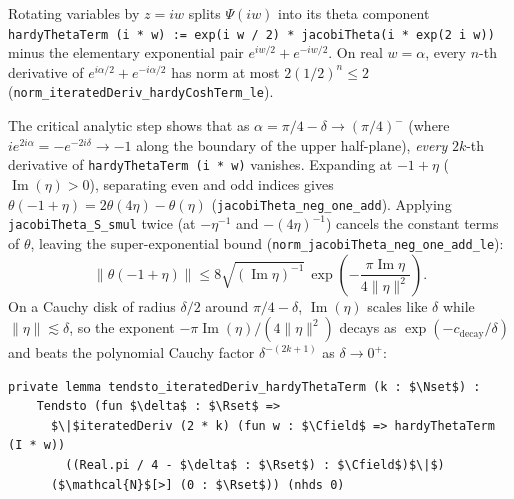 \documentclass[11pt,a4paper]{article}
\theoremstyle{definition}
\newcommand{\Nset}{\mathbb{N}}
\newcommand{\Rset}{\mathbb{R}}
\newcommand{\Cfield}{\mathbb{C}}
\begin{document}
Rotating variables by $z = i w$ splits $\Psi(i w)$ into its theta component \texttt{hardyThetaTerm (i * w) := exp(i w / 2) * jacobiTheta(i * exp(2 i w))} minus the elementary exponential pair $e^{iw/2} + e^{-iw/2}$. On real $w = \alpha$, every $n$-th derivative of $e^{i\alpha/2} + e^{-i\alpha/2}$ has norm at most $2(1/2)^n \le 2$ (\texttt{norm\_\allowbreak iteratedDeriv\_\allowbreak hardyCoshTerm\_le}).

The critical analytic step shows that as $\alpha = \pi/4 - \delta \to (\pi/4)^-$ (where $i e^{2i\alpha} = -e^{-2i\delta} \to -1$ along the boundary of the upper half-plane), \emph{every} $2k$-th derivative of \texttt{hardyThetaTerm (i * w)} vanishes. Expanding at $-1 + \eta$ ($\operatorname{Im}(\eta) > 0$), separating even and odd indices gives $\theta(-1 + \eta) = 2\theta(4\eta) - \theta(\eta)$ (\texttt{jacobiTheta\_\allowbreak neg\_\allowbreak one\_add}). Applying \texttt{jacobiTheta\_S\_smul} twice (at $-\eta^{-1}$ and $-(4\eta)^{-1}$) cancels the constant terms of $\theta$, leaving the super-exponential bound (\texttt{norm\_\allowbreak jacobiTheta\_\allowbreak neg\_\allowbreak one\_\allowbreak add\_le}):
\begin{equation}
\left\|\theta(-1 + \eta)\right\| \le 8 \sqrt{(\operatorname{Im}\eta)^{-1}} \, \exp\!\left(-\frac{\pi \operatorname{Im}\eta}{4\|\eta\|^2}\right).
\end{equation}
On a Cauchy disk of radius $\delta/2$ around $\pi/4 - \delta$, $\operatorname{Im}(\eta)$ scales like $\delta$ while $\|\eta\| \lesssim \delta$, so the exponent $-\pi\operatorname{Im}(\eta)/(4\|\eta\|^2)$ decays as $\exp(-c_{\text{decay}}/\delta)$ and beats the polynomial Cauchy factor $\delta^{-(2k+1)}$ as $\delta \to 0^+$:
\begin{lstlisting}
private lemma tendsto_iteratedDeriv_hardyThetaTerm (k : $\Nset$) :
    Tendsto (fun $\delta$ : $\Rset$ =>
      $\|$iteratedDeriv (2 * k) (fun w : $\Cfield$ => hardyThetaTerm (I * w))
        ((Real.pi / 4 - $\delta$ : $\Rset$) : $\Cfield$)$\|$)
      ($\mathcal{N}$[>] (0 : $\Rset$)) (nhds 0)
\end{lstlisting}
\end{document}
